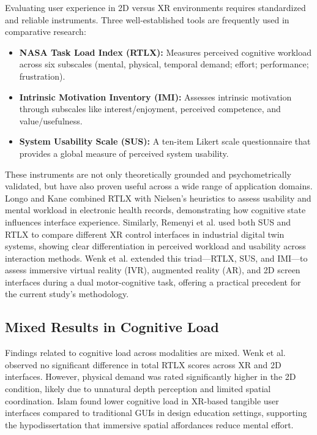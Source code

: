 \documentclass{CPP}
\begin{document}
Evaluating user experience in 2D versus XR environments requires standardized and reliable instruments. Three well-established tools are frequently used in comparative research:
\begin{itemize}
    \item \textbf{NASA Task Load Index (RTLX):} Measures perceived cognitive workload across six subscales (mental, physical, temporal demand; effort; performance; frustration)\cite{Hart2006}.
    \item \textbf{Intrinsic Motivation Inventory (IMI):} Assesses intrinsic motivation through subscales like interest/enjoyment, perceived competence, and value/usefulness\cite{Reynolds2007}. 
    \item \textbf{System Usability Scale (SUS):} A ten-item Likert scale questionnaire that provides a global measure of perceived system usability\cite{Brooke1996}.
\end{itemize}
These instruments are not only theoretically grounded and psychometrically validated, but have also proven useful across a wide range of application domains. Longo and Kane \citep{Longo2011} combined RTLX with Nielsen’s heuristics to assess usability and mental workload in electronic health records, demonstrating how cognitive state influences interface experience. Similarly, Remenyi et al. \citep{Remenyi2024} used both SUS and RTLX to compare different XR control interfaces in industrial digital twin systems, showing clear differentiation in perceived workload and usability across interaction methods. Wenk et al. \citep{Wenk2023} extended this triad—RTLX, SUS, and IMI—to assess immersive virtual reality (IVR), augmented reality (AR), and 2D screen interfaces during a dual motor-cognitive task, offering a practical precedent for the current study’s methodology.


\subsection{Mixed Results in Cognitive Load}

Findings related to cognitive load across modalities are mixed. Wenk et al. \citep{Wenk2023} observed no significant difference in total RTLX scores across XR and 2D interfaces. However, physical demand was rated significantly higher in the 2D condition, likely due to unnatural depth perception and limited spatial coordination. Islam \citep{Islam2020} found lower cognitive load in XR-based tangible user interfaces compared to traditional GUIs in design education settings, supporting the hypodissertation that immersive spatial affordances reduce mental effort.
\end{document}
